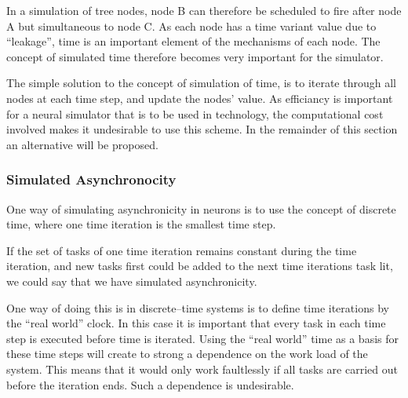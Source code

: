 	In a simulation of tree nodes, node B can therefore be scheduled to fire after node A but simultaneous to node C.
	As each node has a time variant value due to ``leakage'', time is an important element of the mechanisms of each node.
	The concept of simulated time therefore becomes very important for the simulator. 

	The simple solution to the concept of simulation of time, is to iterate through all nodes at each time step, and update the nodes' value.
	As efficiancy is important for a neural simulator that is to be used in technology, the computational cost involved makes it undesirable to use this scheme.
	In the remainder of this section an alternative will be proposed.

	
	 	\subsubsection{Simulated Asynchronocity}
	One way of simulating asynchronicity in neurons is to use the concept of discrete time, where one time iteration is the smallest time step.

	If the set of tasks of one time iteration remains constant during the time iteration, and new tasks first could be added to the next time iterations task lit, we could say that we have simulated asynchronicity.


	One way of doing this is in discrete--time systems is to define time iterations by the ``real world'' clock.
	In this case it is important that every task in each time step is executed before time is iterated.
	Using the ``real world'' time as a basis for these time steps will create to strong a dependence on the work load of the system.
	This means that it would only work faultlessly if all tasks are carried out before the iteration ends.
	Such a dependence is undesirable. %

